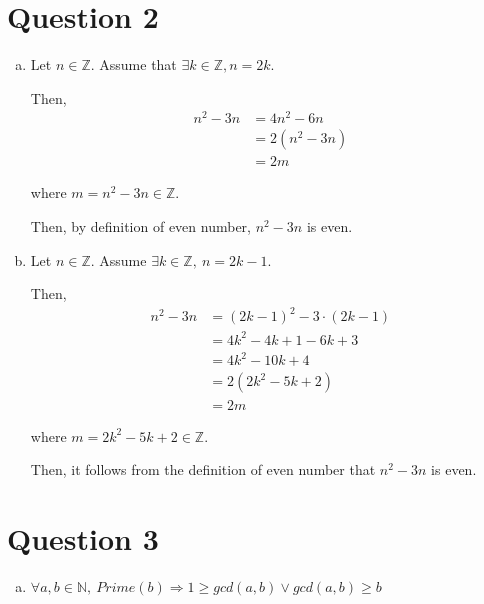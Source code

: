 \documentclass[12pt]{article}
\begin{document}
\section*{Question 2}
\begin{enumerate}[a.]
    \item

    Let $n \in \mathbb{Z}$. Assume that $\exists k \in \mathbb{Z}, n = 2k$.

    \bigskip

    Then,
    \setcounter{equation}{0}
    \begin{align}
        n^2 - 3n &= 4n^2 - 6n\\
        &= 2(n^2 - 3n)\\
        &= 2m
    \end{align}

    where $m = n^2 - 3n \in \mathbb{Z}$.

    \bigskip

    Then, by definition of even number, $n^2 - 3n$ is even.

    \item

    Let $n \in \mathbb{Z}$. Assume $\exists k \in \mathbb{Z},\:n = 2k - 1$.

    \bigskip

    Then,
    \setcounter{equation}{0}
    \begin{align}
        n^2 - 3n &= (2k - 1)^2 - 3 \cdot (2k - 1)\\
        &= 4k^2 - 4k + 1 -6k +3\\
        &= 4k^2 - 10k + 4\\
        &= 2(2k^2 - 5k + 2)\\
        &= 2m
    \end{align}

    where $m = 2k^2 - 5k + 2 \in \mathbb{Z}$.

    \bigskip

    Then, it follows from the definition of even number that $n^2-3n$ is even.
\end{enumerate}

\section*{Question 3}
\begin{enumerate}[a.]
    \item

    $\forall a,b \in \mathbb{N},\:Prime(b) \Rightarrow 1 \geq gcd(a,b) \lor
    gcd(a,b) \geq b$
\end{enumerate}
\end{document}
